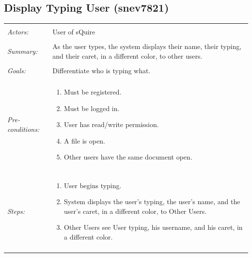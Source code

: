 \documentclass[11pt]{report}
\begin{document}
\subsection{Display Typing User (snev7821)}
\begin{tabular}{ p{2cm} p{12cm} }
\hline \\
	\textit{Actors:} & User of sQuire \\
	\\
	\textit{Summary:} & As the user types, the system displays their name, their typing, and their caret, in a different color, to other users. \\
	\\
	\textit{Goals:} & Differentiate who is typing what. \\
	\\
	\textit{Pre-conditions:} & \begin{enumerate}
		\item Must be registered.
		\item Must be logged in.
		\item User has read/write permission.
		\item A file is open.
		\item Other users have the same document open.
	\end{enumerate} \\
	\\
	\textit{Steps:} & \begin{enumerate}
		\item User begins typing.
		\item System displays the user's typing, the user's name, and the user's caret, in a different color, to Other Users.
		\item Other Users see User typing, his username, and his caret, in a different color.
	\end{enumerate} \\
	\\
\hline
\end{tabular}
\newpage
\end{document}
